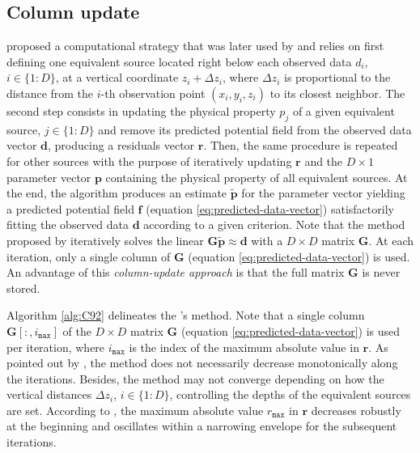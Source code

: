 \subsection{Column update}

\cite{cordell1992} proposed a computational strategy that was later used by \cite{guspi-novara2009} and relies on
first defining one equivalent source located right below each observed data $d_{i}$, $i \in \{1:D\}$, at a vertical
coordinate $z_{i} + \Delta z_{i}$, where $\Delta z_{i}$ is proportional to the distance from the $i$-th observation point 
$(x_{i}, y_{i}, z_{i})$ to its closest neighbor.
The second step consists in updating the physical property $p_{j}$ of a given equivalent source, $j \in \{1:D\}$ and 
remove its predicted potential field from the observed data vector $\mathbf{d}$, producing a residuals vector $\mathbf{r}$. 
Then, the same procedure is repeated for other sources with the purpose of iteratively updating $\mathbf{r}$ and the
$D \times 1$ parameter vector $\mathbf{p}$ containing the physical property of all equivalent sources.
At the end, the algorithm produces an estimate $\tilde{\mathbf{p}}$ for the parameter vector yielding a predicted
potential field $\mathbf{f}$ (equation \ref{eq:predicted-data-vector}) satisfactorily fitting the observed data
$\mathbf{d}$ according to a given criterion.
Note that the method proposed by \cite{cordell1992} iteratively solves the linear $\mathbf{G} \tilde{\mathbf{p}} \approx \mathbf{d}$
with a $D \times D$ matrix $\mathbf{G}$. At each iteration, only a single column of $\mathbf{G}$ (equation \ref{eq:predicted-data-vector}) 
is used.
An advantage of this \textit{column-update approach} is that the full matrix $\mathbf{G}$ is never stored.

Algorithm \ref{alg:C92} delineates the \citeauthor{cordell1992}'s method.
Note that a single column $\mathbf{G}[:, i_{\mathtt{max}}]$ of the $D \times D$ matrix $\mathbf{G}$ (equation \ref{eq:predicted-data-vector})
is used per iteration, where $i_{\mathtt{max}}$ is the index of the maximum absolute value in $\mathbf{r}$.
As pointed out by \cite{cordell1992}, the method does not necessarily decrease monotonically along the iterations.
Besides, the method may not converge depending on how the vertical distances $\Delta z_{i}$, $i \in \{1:D\}$, 
controlling the depths of the equivalent sources are set.
According to \cite{cordell1992}, the maximum absolute value $r_{\mathtt{max}}$ in $\mathbf{r}$ decreases robustly at the beginning 
and oscillates within a narrowing envelope for the subsequent iterations.

